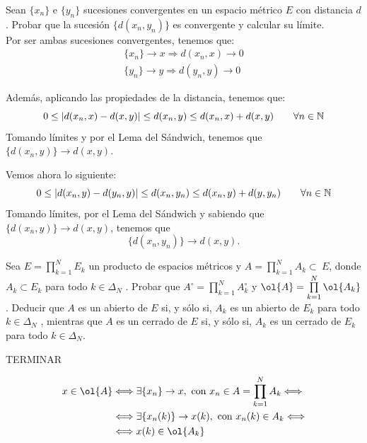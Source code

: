 \begin{ejercicio}
    Sean $\{x_n\}$ e $\{y_n\}$ sucesiones convergentes en un espacio métrico $E$ con distancia $d$. Probar que la sucesión $\{d(x_n, y_n)\}$ es convergente y calcular su límite.\\
    
    Por ser ambas sucesiones convergentes, tenemos que:
    \begin{gather*}
        \{x_n\} \to x \Longrightarrow d(x_n, x)\to 0 \\
        \{y_n\} \to y \Longrightarrow d(y_n, y)\to 0
    \end{gather*}

    Además, aplicando las propiedades de la distancia, tenemos que:
    \begin{equation*}
        0\leq |d(x_n,x)-d(x,y)|\leq d(x_n,y)\leq d(x_n,x) + d(x,y) \qquad \forall n\in \mathbb{N}
    \end{equation*}
    Tomando límites y por el Lema del Sándwich, tenemos que $\{d(x_n,y)\}\to d(x,y)$.

    Vemos ahora lo siguiente:
    \begin{equation*}
        0\leq |d(x_n,y)-d(y_n,y)|\leq d(x_n,y_n)\leq d(x_n,y) + d(y,y_n) \qquad \forall n\in \mathbb{N}
    \end{equation*}
    Tomando límites, por el Lema del Sándwich y sabiendo que $\{d(x_n,y)\}\to d(x,y)$, tenemos que $$\{d(x_n,y_n)\}\to d(x,y).$$
\end{ejercicio}


\begin{ejercicio}
    Sea $E = \prod\limits_{k=1}^N E_k$ un producto de espacios métricos y $A =\prod\limits_{k=1}^N A_k\subset~E$, donde $A_k \subset E_k$ para todo $k \in \Delta_N$ . Probar que $A^\circ =\prod\limits_{k=1}^N A_k^\circ$ y $\ol{A} =\prod\limits_{k=1}^N \ol{A_k}$. Deducir que $A$ es un abierto de $E$ si, y sólo si, $A_k$ es un abierto de $E_k$ para todo $k \in \Delta_N$ , mientras que $A$ es un cerrado de $E$ si, y sólo si, $A_k$ es un cerrado de $E_k$ para todo $k \in \Delta_N$.

    TERMINAR


    \begin{equation*}\begin{split}
        x\in \ol{A} &\Longleftrightarrow \exists \{x_n\}\to x, \text{ con }x_n\in A=\prod\limits_{k=1}^N A_k \Longleftrightarrow \\
        & \Longleftrightarrow  \exists \{x_n(k)\}\to x(k), \text{ con }x_n(k)\in A_k\Longleftrightarrow \\
        & \Longleftrightarrow x(k)\in \ol{A_k}
    \end{split}\end{equation*}
\end{ejercicio}
